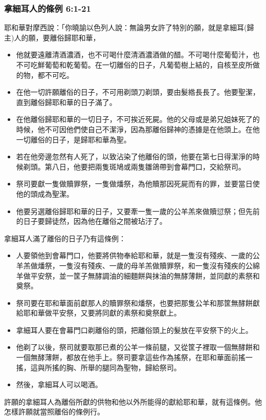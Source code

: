 \subsubsection{拿細耳人的條例 6:1-21}
耶和華對摩西說：「你曉諭以色列人說：無論男女許了特別的願，就是拿細耳(歸主)人的願，要離俗歸耶和華，
\vspace*{-2mm}
\begin{itemize} 
\itemsep-.35em
\item 他就要遠離清酒濃酒，也不可喝什麼清酒濃酒做的醋。不可喝什麼葡萄汁，也不可吃鮮葡萄和乾葡萄。在一切離俗的日子，凡葡萄樹上結的，自核至皮所做的物，都不可吃。
\item 在他一切許願離俗的日子，不可用剃頭刀剃頭，要由髮綹長長了。他要聖潔，直到離俗歸耶和華的日子滿了。
\item 在他離俗歸耶和華的一切日子，不可挨近死屍。他的父母或是弟兄姐妹死了的時候，他不可因他們使自己不潔淨，因為那離俗歸神的憑據是在他頭上。在他一切離俗的日子，是歸耶和華為聖。
\end{itemize} 

\begin{itemize} 
\itemsep-.35em
\item 若在他旁邊忽然有人死了，以致沾染了他離俗的頭，他要在第七日得潔淨的時候剃頭。第八日，他要把兩隻斑鳩或兩隻雛鴿帶到會幕門口，交給祭司。
\item 祭司要獻一隻做贖罪祭，一隻做燔祭，為他贖那因死屍而有的罪，並要當日使他的頭成為聖潔。
\item 他要另選離俗歸耶和華的日子，又要牽一隻一歲的公羊羔來做贖愆祭；但先前的日子要歸徒然，因為他在離俗之間被玷汙了。
\end{itemize} 

拿細耳人滿了離俗的日子乃有這條例：
\vspace*{-2mm}
\begin{itemize} 
\itemsep-.35em
\item 人要領他到會幕門口，他要將供物奉給耶和華，就是一隻沒有殘疾、一歲的公羊羔做燔祭，一隻沒有殘疾、一歲的母羊羔做贖罪祭，和一隻沒有殘疾的公綿羊做平安祭，並一筐子無酵調油的細麵餅與抹油的無酵薄餅，並同獻的素祭和奠祭。
\item 祭司要在耶和華面前獻那人的贖罪祭和燔祭，也要把那隻公羊和那筐無酵餅獻給耶和華做平安祭，又要將同獻的素祭和奠祭獻上。
\item 拿細耳人要在會幕門口剃離俗的頭，把離俗頭上的髮放在平安祭下的火上。
\item 他剃了以後，祭司就要取那已煮的公羊一條前腿，又從筐子裡取一個無酵餅和一個無酵薄餅，都放在他手上。祭司要拿這些作為搖祭，在耶和華面前搖一搖，這與所搖的胸、所舉的腿同為聖物，歸給祭司。
\item 然後，拿細耳人可以喝酒。
\end{itemize}
\vspace*{-2mm}
許願的拿細耳人為離俗所獻的供物和他以外所能得的獻給耶和華，就有這條例。他怎樣許願就當照離俗的條例行。

